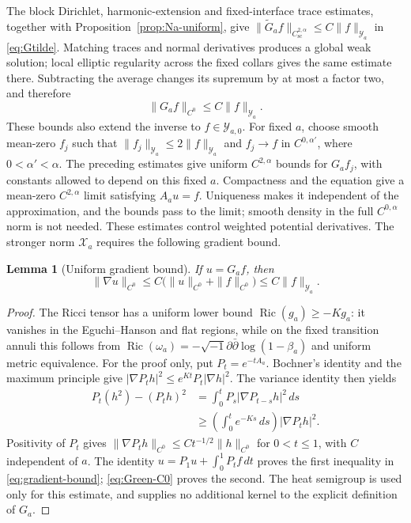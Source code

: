 \documentclass[11pt,a4paper,twoside]{article}
\numberwithin{equation}{section}
\newcommand{\ddc}{\sqrt{-1}\partial\bar\partial}
\newtheorem{lemma}[theorem]{Lemma}
\theoremstyle{definition}
\theoremstyle{remark}
\begin{document}
The block Dirichlet, harmonic-extension and fixed-interface trace
estimates, together with Proposition~\ref{prop:Na-uniform}, give
\(\|\widetilde G_af\|_{C_{\mathrm{sc}}^{2,\alpha}}
\le C\|f\|_{\mathcal Y_a}\) in \eqref{eq:Gtilde}. Matching
traces and normal derivatives produces a global weak solution;
local elliptic regularity across the fixed collars gives the same
estimate there. Subtracting the average changes its supremum by
at most a factor two, and therefore
\begin{equation}\label{eq:Green-C0}
\|G_af\|_{C^0}\le C\|f\|_{\mathcal Y_a}.
\end{equation}
These bounds also extend the inverse to \(f\in\mathcal Y_{a,0}\).
For fixed \(a\), choose smooth mean-zero \(f_j\) such that
\(\|f_j\|_{\mathcal Y_a}\le2\|f\|_{\mathcal Y_a}\) and
\(f_j\to f\) in \(C^{0,\alpha'}\), where \(0<\alpha'<\alpha\).
The preceding estimates give uniform \(C^{2,\alpha}\) bounds for
\(G_af_j\), with constants allowed to depend on this fixed \(a\).
Compactness and the equation give a mean-zero \(C^{2,\alpha}\)
limit satisfying \(A_au=f\). Uniqueness makes it independent of
the approximation, and the bounds pass to the limit; smooth density
in the full \(C^{0,\alpha}\) norm is not needed. These estimates
control weighted potential derivatives. The stronger norm
\(\mathcal X_a\) requires the following gradient bound.
\begin{lemma}[Uniform gradient bound]\label{lem:uniform-gradient}
If \(u=G_af\), then
\begin{equation}\label{eq:gradient-bound}
\|\nabla u\|_{C^0}
\le C\bigl(\|u\|_{C^0}+\|f\|_{C^0}\bigr)
\le C\|f\|_{\mathcal Y_a}.
\end{equation}
\end{lemma}
\begin{proof}
The Ricci tensor has a uniform lower bound
\(\operatorname{Ric}(g_a)\ge-Kg_a\): it vanishes in the
Eguchi--Hanson and flat regions, while on the fixed transition
annuli this follows from
\(\operatorname{Ric}(\omega_a)=-\ddc\log(1-\beta_a)\) and
uniform metric equivalence. For the proof only, put
\(P_t=e^{-tA_a}\). Bochner's identity and the maximum principle
give \(|\nabla P_th|^2\le e^{Kt}P_t|\nabla h|^2\). The variance
identity then yields
\[
\begin{aligned}
P_t(h^2)-(P_th)^2
&=\int_0^tP_s|\nabla P_{t-s}h|^2\,ds\\
&\ge\left(\int_0^te^{-Ks}\,ds\right)|\nabla P_th|^2.
\end{aligned}
\]
Positivity of \(P_t\) gives
\(\|\nabla P_th\|_{C^0}\le Ct^{-1/2}\|h\|_{C^0}\) for
\(0<t\le1\), with \(C\) independent of \(a\). The identity
\(u=P_1u+\int_0^1P_tf\,dt\) proves the first inequality in
\eqref{eq:gradient-bound}; \eqref{eq:Green-C0} proves the second.
The heat semigroup is used only for this estimate, and supplies no
additional kernel to the explicit definition of \(G_a\).
\end{proof}
\end{document}
